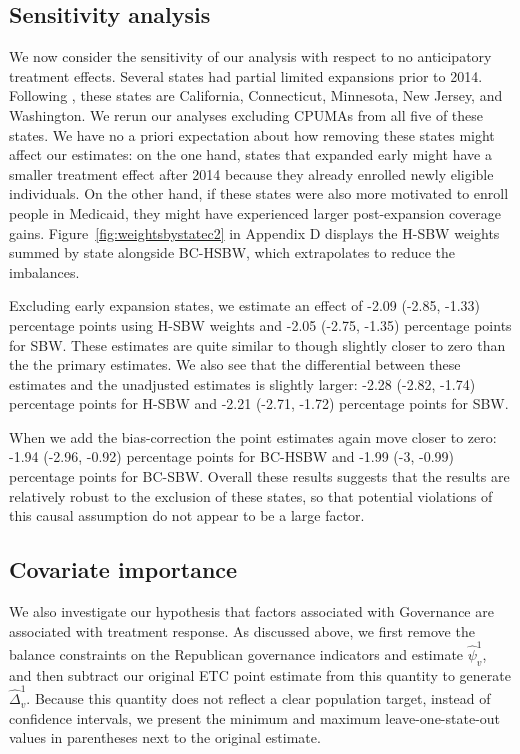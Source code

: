 \subsection{Sensitivity analysis} \label{sssec:sensitivity}

We now consider the sensitivity of our analysis with respect to no anticipatory treatment effects. Several states had partial limited expansions prior to 2014. Following \cite{frean2017premium}, these states are California, Connecticut, Minnesota, New Jersey, and Washington. We rerun our analyses excluding CPUMAs from all five of these states. We have no a priori expectation about how removing these states might affect our estimates: on the one hand, states that expanded early might have a smaller treatment effect after 2014 because they already enrolled newly eligible individuals. On the other hand, if these states were also more motivated to enroll people in Medicaid, they might have experienced larger post-expansion coverage gains. Figure~\ref{fig:weightsbystatec2} in Appendix D displays the H-SBW weights summed by state alongside BC-HSBW, which extrapolates to reduce the imbalances. 

Excluding early expansion states, we estimate an effect of -2.09 (-2.85, -1.33) percentage points using H-SBW weights and -2.05 (-2.75, -1.35) percentage points for SBW. These estimates are quite similar to though slightly closer to zero than the the primary estimates. We also see that the differential between these estimates and the unadjusted estimates is slightly larger: -2.28  (-2.82, -1.74) percentage points for H-SBW and -2.21 (-2.71, -1.72) percentage points for SBW. 

When we add the bias-correction the point estimates again move closer to zero: -1.94 (-2.96, -0.92) percentage points for BC-HSBW and -1.99 (-3, -0.99) percentage points for BC-SBW. Overall these results suggests that the results are relatively robust to the exclusion of these states, so that potential violations of this causal assumption do not appear to be a large factor.

\subsection{Covariate importance}

We also investigate our hypothesis that factors associated with Governance are associated with treatment response. As discussed above, we first remove the balance constraints on the Republican governance indicators and estimate $\hat{\psi}^1_v$, and then subtract our original ETC point estimate from this quantity to generate $\hat{\Delta}_v^1$. Because this quantity does not reflect a clear population target, instead of confidence intervals, we present the minimum and maximum leave-one-state-out values in parentheses next to the original estimate.

